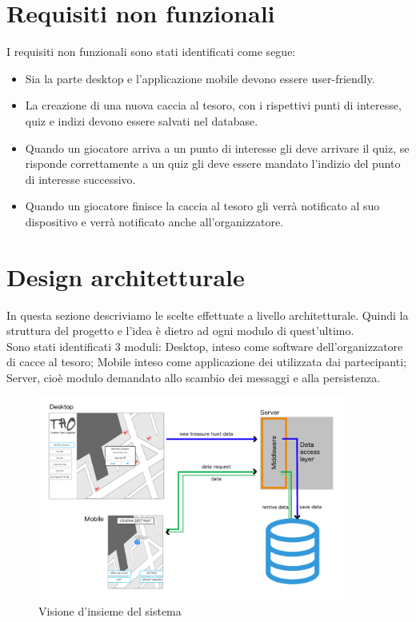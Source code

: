 \documentclass[12pt, italian]{article}
\begin{document}
\section{Requisiti non funzionali}
I requisiti non funzionali sono stati identificati come segue:
\begin{itemize}
	\item Sia la parte desktop e l'applicazione mobile devono essere user-friendly.
	\item La creazione di una nuova caccia al tesoro, con i rispettivi punti di interesse, quiz e indizi devono essere salvati nel database.
	\item Quando un giocatore arriva a un punto di interesse gli deve arrivare il quiz, se risponde correttamente a un quiz gli deve essere mandato l'indizio del punto di interesse successivo.
	\item Quando un giocatore finisce la caccia al tesoro gli verrà notificato al suo dispositivo e verrà notificato anche all'organizzatore.
\end{itemize}


\section{Design architetturale}
In questa sezione descriviamo le scelte effettuate a livello architetturale. Quindi la struttura del progetto e l'idea è dietro ad ogni modulo di quest'ultimo.\\
Sono stati identificati 3 moduli: Desktop, inteso come software dell'organizzatore di cacce al tesoro; Mobile inteso come applicazione dei utilizzata dai partecipanti; Server, cioè modulo demandato allo scambio dei messaggi e alla persistenza.

\begin{figure}[H]
	\centering
	\includegraphics[width=0.9\textwidth]{img/architetturale01.png}
	\caption{Visione d'insieme del sistema}
\end{figure}
\end{document}
